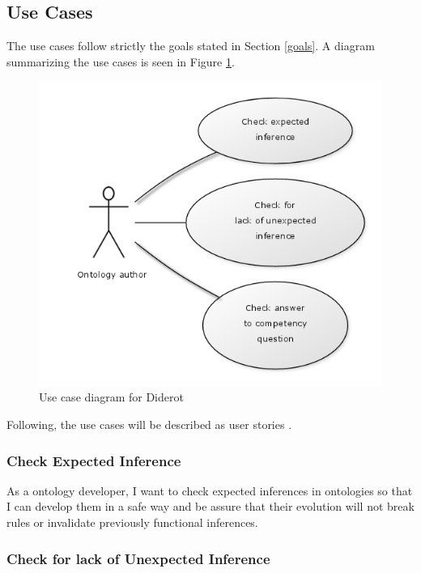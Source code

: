 \documentclass{report}
\begin{document}
\subsection{Use Cases}
\label{useCases}

The use cases follow strictly the goals stated in Section \ref{goals}. A diagram summarizing the use cases is seen
in Figure \ref{figUseCase}.

\begin{figure}[!hbt]
    \centering
    \label{figUseCase}
    \caption{Use case diagram for Diderot}
    \includegraphics[scale=0.75]{fig/use_case_diagram.png}
\end{figure}

Following, the use cases will be described as user stories \cite{beck04}.

\subsubsection{Check Expected Inference}

As a ontology developer, I want to check expected inferences in ontologies so that I can develop them
in a safe way and be assure that their evolution will not break rules or invalidate previously
functional inferences.

\subsubsection{Check for lack of Unexpected Inference}
\end{document}
